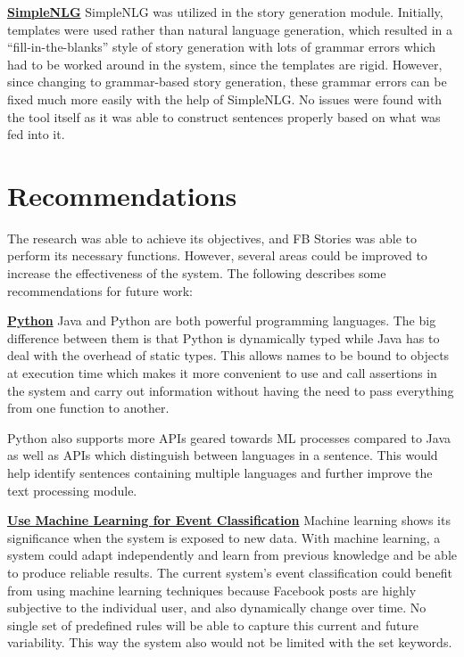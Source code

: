\underline{\textbf{SimpleNLG}}
SimpleNLG was utilized in the story generation module. Initially, templates were used rather than natural language generation, which resulted in a “fill-in-the-blanks” style of story generation with lots of grammar errors which had to be worked around in the system, since the templates are rigid. However, since changing to grammar-based story generation, these grammar errors can be fixed much more easily with the help of SimpleNLG. No issues were found with the tool itself as it was able to construct sentences properly based on what was fed into it. 

\section{Recommendations}
The research was able to achieve its objectives, and FB Stories was able to perform its necessary functions. However, several areas could be improved to increase the effectiveness of the system. The following describes some recommendations for future work:

\underline{\textbf{Python}}
Java and Python are both powerful programming languages. The big difference between them is that Python is dynamically typed while Java has to deal with the overhead of static types. This allows names to be bound to objects at execution time which makes it more convenient to use and call assertions in the system and carry out information without having the need to pass everything from one function to another. 

Python also supports more APIs geared towards ML processes compared to Java as well as APIs which distinguish between languages in a sentence. This would help identify sentences containing multiple languages and further improve the text processing module.

\underline{\textbf{Use Machine Learning for Event Classification}}
Machine learning shows its significance when the system is exposed to new data. With machine learning, a system could adapt independently and learn from previous knowledge and be able to produce reliable results. The current system’s event classification could benefit from using machine learning techniques because Facebook posts are highly subjective to the individual user, and also dynamically change over time. No single set of predefined rules will be able to capture this current and future variability. This way the system also would not be limited with the set keywords.

